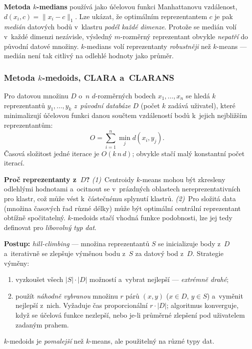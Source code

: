\documentclass[11pt,a4paper]{article}
\theoremstyle{definition}
\begin{document}
\textbf{Metoda $k$-medians} používá jako účelovou funkci Manhattanovu vzdálenost,
$d(x_i,c)=\|x_i-c\|_1$. Lze ukázat, že optimálním reprezentantem $c$ je pak \emph{medián}
datových bodů v~klastru \emph{podél každé dimenze}. Protože se medián volí v~každé dimenzi
nezávisle, výsledný $m$-rozměrný reprezentant obvykle \emph{nepatří} do původní datové
množiny. $k$-medians volí reprezentanty \emph{robustněji} než $k$-means --- medián není tak
citlivý na odlehlé hodnoty jako průměr.

\subsubsection{Metoda $k$-medoids, CLARA a~CLARANS}

\begin{defbox}
Pro datovou množinu $D$ o~$n$ $d$-rozměrných bodech $x_1,\dots,x_n$ se hledá $k$
reprezentantů $y_1,\dots,y_k$ \emph{z~původní databáze} $D$ (počet $k$ zadává uživatel), které
minimalizují účelovou funkci danou součtem vzdáleností bodů k~jejich nejbližším
reprezentantům:
\[ O=\sum_{i=1}^{n}\min_{j} d(x_i,y_j). \]
Časová složitost jedné iterace je $O(k\,n\,d)$; obvykle stačí malý konstantní počet iterací.

\textbf{Proč reprezentanty z~$D$?} \emph{(1)}~Centroidy $k$-means mohou být zkresleny odlehlými
hodnotami a~ocitnout se v~prázdných oblastech nereprezentativních pro klastr, což může vést
k~částečnému splynutí klastrů. \emph{(2)}~Pro složitá data (množina časových řad různé délky)
může být optimální centrální reprezentant obtížně spočitatelný. $k$-medoids stačí vhodná
funkce podobnosti, lze jej tedy definovat pro \emph{libovolný typ dat}.

\textbf{Postup:} \emph{hill-climbing} --- množina reprezentantů $S$ se inicializuje body
z~$D$ a~iterativně se zlepšuje výměnou bodu z~$S$ za datový bod z~$D$. Strategie výměny:
\begin{enumerate}
\item vyzkoušet všech $|S|\cdot|D|$ možností a~vybrat nejlepší --- \emph{extrémně drahé};
\item použít \emph{náhodně vybranou} množinu $r$ párů $(x,y)$ ($x\in D$, $y\in S$) a~vyměnit
      nejlepší z~nich. Vyžaduje čas proporcionální $r\cdot|D|$; algoritmus konverguje, když
      se účelová funkce nezlepší, nebo je-li průměrné zlepšení pod uživatelem zadaným prahem.
\end{enumerate}
$k$-medoids je \emph{pomalejší} než $k$-means, ale použitelný na různé typy dat.
\end{defbox}
\end{document}
